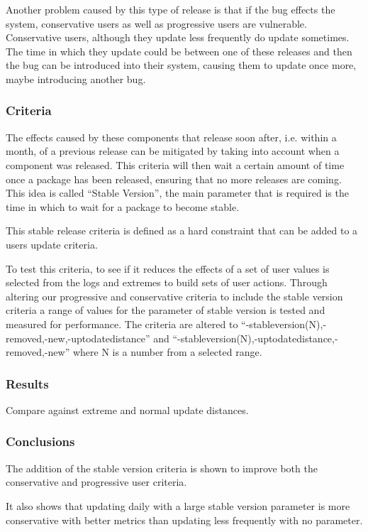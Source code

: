 Another problem caused by this type of release is that if the bug effects the system, conservative users as well as progressive users are vulnerable.
Conservative users, although they update less frequently do update sometimes.
The time in which they update could be between one of these releases and then the bug can be introduced into their system, 
causing them to update once more, maybe introducing another bug.


\subsubsection{Criteria}   
The effects caused by these components that release soon after, i.e. within a month, of a previous release can be mitigated by taking into account when a component was released.
This criteria will then wait a certain amount of time once a package has been released, ensuring that no more releases are coming.
This idea is called ``Stable Version'', the main parameter that is required is the time in which to wait for a package to become stable.

This stable release criteria is defined as a hard constraint that can be added to a users update criteria.

To test this criteria, to see if it reduces the effects of a set of user values is selected from the logs and extremes to build sets of user actions.
Through altering our progressive and conservative criteria to include the stable version criteria a range of values for the parameter of stable version is tested and measured for performance.
The criteria are altered to ``-stableversion(N),-removed,-new,-uptodatedistance'' and ``-stableversion(N),-uptodatedistance,-removed,-new'' where N is a number from a selected range.

\subsubsection{Results}
Compare against extreme and normal update distances.

\subsubsection{Conclusions}
The addition of the stable version criteria is shown to improve both the conservative and progressive user criteria.

It also shows that updating daily with a large stable version parameter is more conservative with better metrics than updating less frequently with no parameter.

